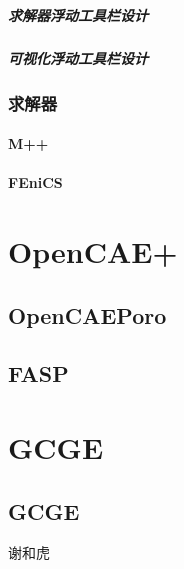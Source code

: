 \documentclass[letterpaper,10pt,english]{sphinxmanual}
\begin{document}
\paragraph{求解器浮动工具栏设计}
\label{\detokenize{src/fengsim/airfoil:id6}}

\paragraph{可视化浮动工具栏设计}
\label{\detokenize{src/fengsim/airfoil:id7}}

\subsection{求解器}
\label{\detokenize{src/fengsim/airfoil:id8}}

\subsubsection{M++}
\label{\detokenize{src/fengsim/airfoil:m}}

\subsubsection{FEniCS}
\label{\detokenize{src/fengsim/airfoil:fenics}}
\sphinxstepscope


\chapter{OpenCAE+}
\label{\detokenize{src/opencaeplus/main:opencae}}\label{\detokenize{src/opencaeplus/main::doc}}

\section{OpenCAEPoro}
\label{\detokenize{src/opencaeplus/main:opencaeporo}}

\section{FASP}
\label{\detokenize{src/opencaeplus/main:fasp}}
\sphinxstepscope


\chapter{GCGE}
\label{\detokenize{src/gcge/main:gcge}}\label{\detokenize{src/gcge/main::doc}}

\section{GCGE}
\label{\detokenize{src/gcge/main:id1}}
\sphinxAtStartPar
谢和虎
\end{document}
